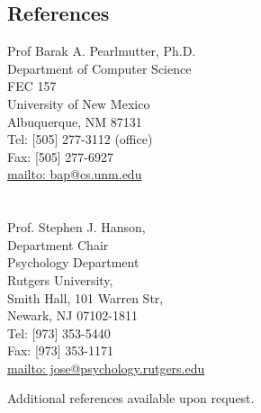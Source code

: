 \documentclass[10pt,overlapped,line]{res}
\begin{document}
\begin{resume}
\section{References}
 \begin{multicols}{2}
{\small
   Prof Barak A. Pearlmutter, Ph.D. \\
   Department of Computer Science \\
   FEC 157 \\
   University of New Mexico \\
   Albuquerque, NM  87131 \\
   Tel: [505] 277-3112 (office) \\
   Fax: [505] 277-6927 \\
   \href{URL}{mailto: bap@cs.unm.edu} \\
\\
\\
   Prof. Stephen J. Hanson, \\
   Department Chair \\
   Psychology Department \\
   Rutgers University, \\
   Smith Hall, 101 Warren Str, \\
   Newark, NJ 07102-1811 \\
   Tel: [973] 353-5440 \\
   Fax: [973] 353-1171 \\
   \href{URL}{mailto: jose@psychology.rutgers.edu} \\
}
\end{multicols}

Additional references available upon request.



\end{resume}
\end{document}
